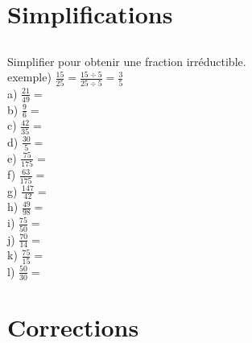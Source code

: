 \documentclass{article}
\begin{document}
\huge

\section*{Simplifications}
\subsection*{}
Simplifier pour obtenir une fraction irréductible.\\
exemple) $\frac{15}{25}=\frac{15\div5}{25\div5}=\frac{3}{5}$\\ 
\vspace{10 mm}
a) $\frac{21}{49}=$\\ 
\vspace{10 mm}
b) $\frac{9}{6}=$\\ 
\vspace{10 mm}
c) $\frac{42}{35}=$\\ 
\vspace{10 mm}
d) $\frac{30}{5}=$\\ 
\vspace{10 mm}
e) $\frac{75}{175}=$\\ 
\vspace{10 mm}
f) $\frac{63}{175}=$\\ 
\vspace{10 mm}
g) $\frac{147}{42}=$\\ 
\vspace{10 mm}
h) $\frac{49}{98}=$\\ 
\vspace{10 mm}
i) $\frac{75}{50}=$\\ 
\vspace{10 mm}
j) $\frac{70}{14}=$\\ 
\vspace{10 mm}
k) $\frac{75}{15}=$\\ 
\vspace{10 mm}
l) $\frac{50}{30}=$\\ 
\vspace{10 mm}
\section*{Corrections}
\end{document}

